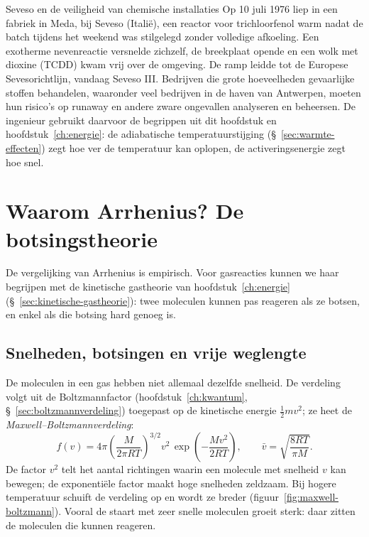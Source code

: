 \begin{toepassing}{Seveso en de veiligheid van chemische installaties}
Op 10 juli 1976 liep in een fabriek in Meda, bij Seveso (Itali\"e), een reactor voor trichloorfenol warm nadat de batch tijdens het weekend was stilgelegd zonder volledige afkoeling. Een exotherme nevenreactie versnelde zichzelf, de breekplaat opende en een wolk met dioxine (TCDD) kwam vrij over de omgeving. De ramp leidde tot de Europese Sevesorichtlijn, vandaag Seveso III. Bedrijven die grote hoeveelheden gevaarlijke stoffen behandelen, waaronder veel bedrijven in de haven van Antwerpen, moeten hun risico's op runaway en andere zware ongevallen analyseren en beheersen. De ingenieur gebruikt daarvoor de begrippen uit dit hoofdstuk en hoofdstuk~\ref{ch:energie}: de adiabatische temperatuurstijging (\S~\ref{sec:warmte-effecten}) zegt hoe ver de temperatuur kan oplopen, de activeringsenergie zegt hoe snel.
\end{toepassing}

\section{Waarom Arrhenius? De botsingstheorie}
\label{sec:botsingstheorie}

De vergelijking van Arrhenius is empirisch. Voor gasreacties kunnen we haar begrijpen met de kinetische gastheorie van hoofdstuk~\ref{ch:energie} (\S~\ref{sec:kinetische-gastheorie}): twee moleculen kunnen pas reageren als ze botsen, en enkel als die botsing hard genoeg is.

\subsection{Snelheden, botsingen en vrije weglengte}

De moleculen in een gas hebben niet allemaal dezelfde snelheid. De verdeling volgt uit de Boltzmannfactor (hoofdstuk~\ref{ch:kwantum}, \S~\ref{sec:boltzmannverdeling}) toegepast op de kinetische energie $\tfrac12 mv^2$; ze heet de \emph{Maxwell--Boltzmannverdeling}:
\begin{equation}
f(v) = 4\pi\left(\frac{M}{2\pi RT}\right)^{3/2} v^2\,\exp\!\left(-\frac{Mv^2}{2RT}\right),
\qquad
\bar v = \sqrt{\frac{8RT}{\pi M}}.
\label{eq:maxwell-boltzmann}
\end{equation}
De factor $v^2$ telt het aantal richtingen waarin een molecule met snelheid $v$ kan bewegen; de exponenti\"ele factor maakt hoge snelheden zeldzaam. Bij hogere temperatuur schuift de verdeling op en wordt ze breder (figuur~\ref{fig:maxwell-boltzmann}). Vooral de staart met zeer snelle moleculen groeit sterk: daar zitten de moleculen die kunnen reageren.

